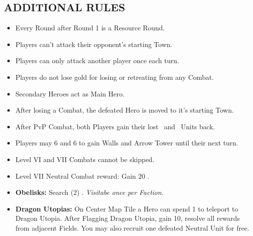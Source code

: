 \begin{multicols*}{2}
\subsection*{\MakeUppercase{Additional Rules}}
\begin{itemize}
  \item Every Round after Round 1 is a Resource Round.
  \item Players can't attack their opponent's starting Town.
  \item Players can only attack another player once each turn.
  \item Players do not lose gold for losing or retreating from any Combat.
  \item Secondary Heroes act as Main Hero.
  \item After losing a Combat, the defeated Hero is moved to it's starting Town.
  \item After PvP Combat, both Players gain their lost \bronze\ and \silver\ Units back.
  \item Players may  6  and 6  to gain Walls and Arrow Tower until their next turn.
  \item Level VI and VII Combats cannot be skipped.
  \item Level VII Neutral Combat reward: Gain 20 .
  \item \textbf{Obelisks:} Search (2) . \textit{Visitabe once per Faction.}
  \item \textbf{Dragon Utopias:} On Center Map Tile a Hero can spend 1  to teleport to Dragon Utopia. After Flagging Dragon Utopia, gain 10, resolve all rewards from adjacent Fields. You may also recruit one defeated Neutral Unit for free.
\end{itemize}


\end{multicols*}
